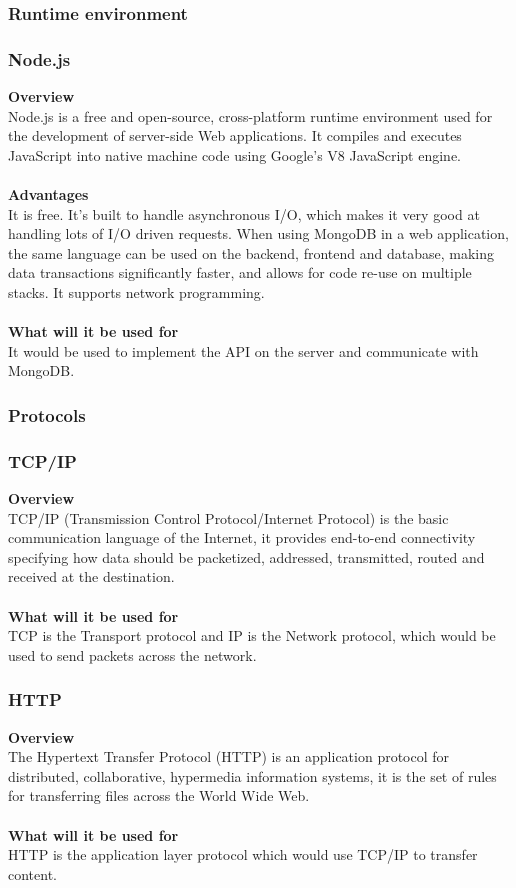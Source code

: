 \documentclass{article}
\begin{document}
\subsubsection{Runtime environment}
\subsubsection*{Node.js}
\textbf{Overview}\\
Node.js is a free and open-source, cross-platform runtime environment used for the development of server-side Web applications. It compiles and executes JavaScript into native machine code using Google's V8 JavaScript engine.\\\\
\textbf{Advantages}\\
It is free. It's built to handle asynchronous I/O, which makes it very good at handling lots of I/O driven requests. When using MongoDB in a web application, the same language can be used on the backend, frontend and database, making data transactions significantly faster, and allows for code re-use on multiple stacks. It supports network programming.\\\\
\textbf{What will it be used for}\\
It would be used to implement the API on the server and communicate with MongoDB.

\subsubsection{Protocols}
\subsubsection*{TCP/IP}
\textbf{Overview}\\
TCP/IP (Transmission Control Protocol/Internet Protocol) is the basic communication language of the Internet, it provides end-to-end connectivity specifying how data should be packetized, addressed, transmitted, routed and received at the destination. \\\\
\textbf{What will it be used for}\\
TCP is the Transport protocol and IP is the Network protocol, which would be used to send packets across the network.

\subsubsection*{HTTP}
\textbf{Overview}\\
The Hypertext Transfer Protocol (HTTP) is an application protocol for distributed, collaborative, hypermedia information systems, it is the set of rules for transferring files across the World Wide Web.\\\\
\textbf{What will it be used for}\\
HTTP is the application layer protocol which would use TCP/IP to transfer content.
\end{document}
